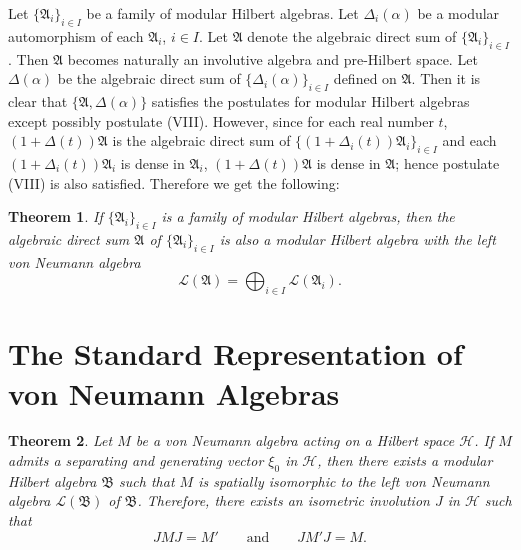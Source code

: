 \documentclass[12pt,b5paper,twoside]{article}
\theoremstyle{takesaki}
\newtheorem{theorem}{Theorem}[section]
\numberwithin{equation}{section}
\begin{document}
Let $\{\mathfrak A_i\}_{i\in I}$ be a family of modular Hilbert
algebras.  Let $\Delta_i(\alpha)$ be a modular automorphism of each
$\mathfrak A_i$, $i\in I$.  Let $\mathfrak A$ denote the algebraic
direct sum of $\{\mathfrak A_i\}_{i\in I}$.  Then $\mathfrak A$
becomes naturally an involutive algebra and pre-Hilbert space.  Let
$\Delta(\alpha)$ be the algebraic direct sum of
$\{\Delta_i(\alpha)\}_{i\in I}$ defined on $\mathfrak A$.  Then it is
clear that $\{\mathfrak A,\Delta(\alpha)\}$ satisfies the postulates
for modular Hilbert algebras except possibly postulate
(VIII).  However, since for each real number $t$,
$(1+\Delta(t))\mathfrak A$ is the algebraic direct sum of
$\{(1+\Delta_i(t))\mathfrak A_i\}_{i\in I}$ and each
$(1+\Delta_i(t))\mathfrak A_i$ is dense in $\mathfrak A_i$,
$(1+\Delta(t))\mathfrak A$ is dense in $\mathfrak A$; hence
postulate (VIII) is also satisfied.  Therefore we get the following:

\begin{theorem}\label{thm:11.2}
If $\{\mathfrak A_i\}_{i\in I}$ is a family of modular Hilbert
algebras, then the algebraic direct sum $\mathfrak A$ of
$\{\mathfrak A_i\}_{i\in I}$ is also a modular Hilbert algebra with
the left von Neumann algebra
\[
  \mathcal L(\mathfrak A)=\bigoplus_{i\in I}\mathcal L(\mathfrak A_i).
\]
\end{theorem}

\section{The Standard Representation of von Neumann Algebras}
\label{sec:12}

\begin{theorem}\label{thm:12.1}
Let $M$ be a von Neumann algebra acting on a Hilbert space
$\mathcal H$.  If $M$ admits a separating and generating vector
$\xi_0$ in $\mathcal H$, then there exists a modular Hilbert algebra
$\mathfrak B$ such that $M$ is spatially isomorphic to the left von
Neumann algebra $\mathcal L(\mathfrak B)$ of $\mathfrak B$.
Therefore, there exists an isometric involution $J$ in $\mathcal H$
such that
\[
  JMJ=M'
  \qquad\text{and}\qquad
  JM'J=M.
\]
\end{theorem}
\end{document}
